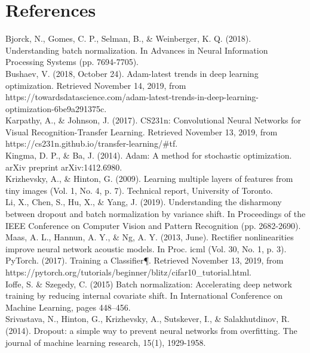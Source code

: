 \documentclass[11pt]{article}
\begin{document}
\newpage
    \section*{References}\label{references}

Bjorck, N., Gomes, C. P., Selman, B., \& Weinberger, K. Q. (2018).
Understanding batch normalization. In Advances in Neural Information
Processing Systems (pp. 7694-7705).\\

Bushaev, V. (2018, October 24). Adam-latest trends in deep learning
optimization. Retrieved November 14, 2019, from
https://towardsdatascience.com/adam-latest-trends-in-deep-learning-optimization-6be9a291375c.\\

Karpathy, A., \& Johnson, J. (2017). CS231n: Convolutional Neural
Networks for Visual Recognition-Transfer Learning. Retrieved November
13, 2019, from https://cs231n.github.io/transfer-learning/\#tf.\\

Kingma, D. P., \& Ba, J. (2014). Adam: A method for stochastic
optimization. arXiv preprint arXiv:1412.6980.\\

Krizhevsky, A., \& Hinton, G. (2009). Learning multiple layers of
features from tiny images (Vol. 1, No. 4, p. 7). Technical report,
University of Toronto.\\

Li, X., Chen, S., Hu, X., \& Yang, J. (2019). Understanding the
disharmony between dropout and batch normalization by variance shift. In
Proceedings of the IEEE Conference on Computer Vision and Pattern
Recognition (pp. 2682-2690).\\

Maas, A. L., Hannun, A. Y., \& Ng, A. Y. (2013, June). Rectifier
nonlinearities improve neural network acoustic models. In Proc. icml
(Vol. 30, No. 1, p. 3).\\

PyTorch. (2017). Training a Classifier¶. Retrieved November 13, 2019,
from
https://pytorch.org/tutorials/beginner/blitz/cifar10\_tutorial.html.\\

Ioffe, S. \& Szegedy, C. (2015) Batch normalization: Accelerating deep
network training by reducing internal covariate shift. In International
Conference on Machine Learning, pages 448--456.\\

Srivastava, N., Hinton, G., Krizhevsky, A., Sutskever, I., \&
Salakhutdinov, R. (2014). Dropout: a simple way to prevent neural
networks from overfitting. The journal of machine learning research,
15(1), 1929-1958.\\
\end{document}
